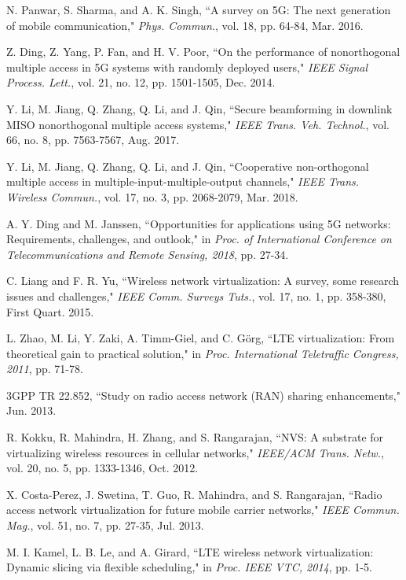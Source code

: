 \documentclass[journal]{IEEEtran}
\begin{document}
\begin{thebibliography}{1}	
 N. Panwar, S. Sharma, and A. K. Singh, ``A survey on 5G: The next generation of mobile communication," \emph{Phys. Commun.}, vol. 18, pp. 64-84, Mar. 2016.

 Z. Ding, Z. Yang, P. Fan, and H. V. Poor, ``On the performance of nonorthogonal multiple access in 5G systems with randomly deployed users," \emph{IEEE Signal Process. Lett.}, vol. 21, no. 12, pp. 1501-1505, Dec. 2014.

 Y. Li, M. Jiang, Q. Zhang, Q. Li, and J. Qin, ``Secure beamforming in downlink MISO nonorthogonal multiple access systems," \emph{IEEE Trans. Veh. Technol.}, vol. 66, no. 8, pp. 7563-7567, Aug. 2017.

 Y. Li, M. Jiang, Q. Zhang, Q. Li, and J. Qin, ``Cooperative non-orthogonal multiple access in multiple-input-multiple-output channels," \emph{IEEE Trans. Wireless Commun.}, vol. 17, no. 3, pp. 2068-2079, Mar. 2018.

 A. Y. Ding and M. Janssen, ``Opportunities for applications using 5G networks: Requirements, challenges, and outlook," in \emph{Proc. of International Conference on Telecommunications and Remote Sensing, 2018}, pp. 27-34.
	
 C. Liang and F. R. Yu, ``Wireless network virtualization: A survey, some research issues and challenges," \emph{IEEE Comm. Surveys Tuts.}, vol. 17, no. 1, pp. 358-380, First Quart. 2015.

 L. Zhao, M. Li, Y. Zaki, A. Timm-Giel, and C. G\"org, ``LTE virtualization: From theoretical gain to practical solution," in \emph{Proc. International Teletraffic Congress, 2011}, pp. 71-78.

 3GPP TR 22.852, ``Study on radio access network (RAN) sharing enhancements," Jun. 2013.

 R. Kokku, R. Mahindra, H. Zhang, and S. Rangarajan, ``NVS: A substrate for virtualizing wireless resources in cellular networks," \emph{IEEE/ACM Trans. Netw.}, vol. 20, no. 5, pp. 1333-1346, Oct. 2012.

 X. Costa-Perez, J. Swetina, T. Guo, R. Mahindra, and S. Rangarajan, ``Radio access network virtualization for future mobile carrier networks," \emph{IEEE Commun. Mag.}, vol. 51, no. 7, pp. 27-35, Jul. 2013.

 M. I. Kamel, L. B. Le, and A. Girard, ``LTE wireless network virtualization: Dynamic slicing via flexible scheduling," in \emph{Proc. IEEE VTC, 2014}, pp. 1-5.


\end{thebibliography}
\end{document}

